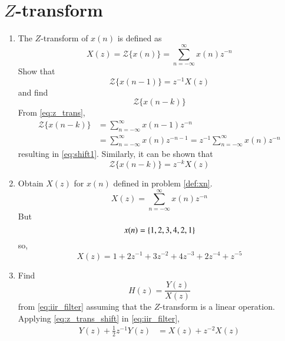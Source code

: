 \documentclass[journal,12pt,twocolumn]{IEEEtran}
\renewcommand\thesection{\arabic{section}}
\begin{document}
\section{$Z$-transform}
\begin{enumerate}[label=\thesection.\arabic*]
\item The $Z$-transform of $x(n)$ is defined as
%
\begin{equation}
	\label{eq:z_trans}
	X(z)={\mathcal {Z}}\{x(n)\}=\sum _{n=-\infty }^{\infty }x(n)z^{-n}
\end{equation}
%
Show that
\begin{equation}
	\label{eq:shift1}
	{\mathcal {Z}}\{x(n-1)\} = z^{-1}X(z)
\end{equation}
and find
\begin{equation}
	{\mathcal {Z}}\{x(n-k)\} 
\end{equation}
\solution From \eqref{eq:z_trans},
\begin{align}
	{\mathcal {Z}}\{x(n-k)\} &=\sum _{n=-\infty }^{\infty }x(n-1)z^{-n}
	\\
	&=\sum _{n=-\infty }^{\infty }x(n)z^{-n-1} = z^{-1}\sum _{n=-\infty }^{\infty }x(n)z^{-n}
\end{align}
resulting in \eqref{eq:shift1}. Similarly, it can be shown that
%
\begin{equation}
	\label{eq:z_trans_shift}
	{\mathcal {Z}}\{x(n-k)\} = z^{-k}X(z)
\end{equation}
\item Obtain $X(z)$ for $x(n)$ defined in problem 
\ref{def:xn}.
\solution
\begin{equation}
	X(z) = \sum_{n=-\infty}^{\infty}x(n)z^{-n}
\end{equation}
But
\begin{equation}
	x(n) = \left\{1,2,3,4,2,1\right\}
\end{equation}
so,
\begin{equation}
	X(z) = 1 + 2z^{-1} + 3z^{-2} + 4z^{-3} + 2z^{-4} + z^{-5}
\end{equation}
\item Find
%
\begin{equation}
	H(z) = \frac{Y(z)}{X(z)}
\end{equation}
%
from  \eqref{eq:iir_filter} assuming that the $Z$-transform is a linear operation.
\\
\solution  Applying \eqref{eq:z_trans_shift} in \eqref{eq:iir_filter},
\begin{align}
	Y(z) + \frac{1}{2}z^{-1}Y(z) &= X(z)+z^{-2}X(z)
	\\

\end{align}
\end{enumerate}
\end{document}
